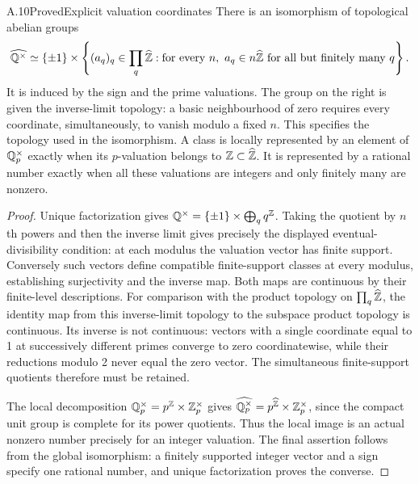 \begin{statement}{A.10}{Proved}{Explicit valuation coordinates}
There is an isomorphism of topological abelian groups
\[
 \widehat{\mathbb Q^\times}\simeq
 \{\pm1\}\times
 \left\{(a_q)_q\in\prod_q\widehat{\mathbb Z}:
    \text{for every }n,\ a_q\in n\widehat{\mathbb Z}
                  \text{ for all but finitely many }q\right\}.
\]
It is induced by the sign and the prime valuations.
The group on the right is given the inverse-limit topology: a basic
neighbourhood of zero requires every coordinate, simultaneously, to
vanish modulo a fixed $n$. This specifies the topology used in the
isomorphism.
A class is locally represented by an element of $\mathbb Q_p^\times$
exactly when its $p$-valuation belongs to $\mathbb Z\subset\widehat{\mathbb Z}$.
It is represented by a rational number exactly when all these
valuations are integers and only finitely many are nonzero.
\end{statement}
\begin{proof}
Unique factorization gives
$\mathbb Q^\times=\{\pm1\}\times\bigoplus_q q^{\mathbb Z}$.
Taking the quotient by $n$th powers and then the inverse limit
gives precisely the displayed eventual-divisibility condition:
at each modulus the valuation vector has finite support.
Conversely such vectors define compatible finite-support classes
at every modulus, establishing surjectivity and the inverse map.
Both maps are continuous by their finite-level descriptions.
For comparison with the product topology on
$\prod_q\widehat{\mathbb Z}$, the identity map from this inverse-limit
topology to the subspace product topology is continuous. Its inverse
is not continuous: vectors with a single coordinate equal to 1 at
successively different primes converge to zero coordinatewise, while
their reductions modulo 2 never equal the zero vector. The
simultaneous finite-support quotients therefore must be retained.

The local decomposition
$\mathbb Q_p^\times=p^\mathbb Z\times\mathbb Z_p^\times$ gives
$\widehat{\mathbb Q_p^\times}=p^{\widehat{\mathbb Z}}\times\mathbb Z_p^\times$,
since the compact unit group is complete for its power quotients.
Thus the local image is an actual nonzero number precisely for an
integer valuation. The final assertion follows from the global
isomorphism: a finitely supported integer vector and a sign specify
one rational number, and unique factorization proves the converse.
\end{proof}

